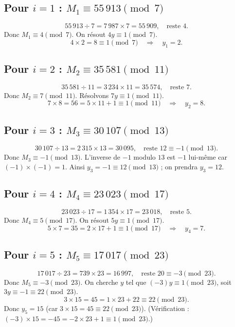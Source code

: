 \documentclass[12pt,a4paper]{article}
\begin{document}
\subsection*{Pour $i=1$ : $M_1 \equiv 55\,913 \pmod{7}$}
\[
55\,913 \div 7 = 7\,987 \times 7 = 55\,909,\quad \text{reste } 4.
\]
Donc $M_1 \equiv 4 \pmod{7}$.
On résout $4y \equiv 1 \pmod{7}$.
\[
4 \times 2 = 8 \equiv 1 \pmod{7} \quad\Longrightarrow\quad y_1 = 2.
\]

\subsection*{Pour $i=2$ : $M_2 \equiv 35\,581 \pmod{11}$}
\[
35\,581 \div 11 = 3\,234 \times 11 = 35\,574,\quad \text{reste } 7.
\]
Donc $M_2 \equiv 7 \pmod{11}$.
Résolvons $7y \equiv 1 \pmod{11}$.
\[
7 \times 8 = 56 = 5\times 11 + 1 \equiv 1 \pmod{11} \quad\Longrightarrow\quad y_2 = 8.
\]

\subsection*{Pour $i=3$ : $M_3 \equiv 30\,107 \pmod{13}$}
\[
30\,107 \div 13 = 2\,315 \times 13 = 30\,095,\quad \text{reste } 12 \equiv -1 \pmod{13}.
\]
Donc $M_3 \equiv -1 \pmod{13}$.
L’inverse de $-1$ modulo $13$ est $-1$ lui-même car $(-1)\times(-1)=1$.
Ainsi $y_3 = -1 \equiv 12 \pmod{13}$ ; on prendra $y_3 = 12$.

\subsection*{Pour $i=4$ : $M_4 \equiv 23\,023 \pmod{17}$}
\[
23\,023 \div 17 = 1\,354 \times 17 = 23\,018,\quad \text{reste } 5.
\]
Donc $M_4 \equiv 5 \pmod{17}$.
On résout $5y \equiv 1 \pmod{17}$.
\[
5 \times 7 = 35 = 2\times 17 + 1 \equiv 1 \pmod{17} \quad\Longrightarrow\quad y_4 = 7.
\]

\subsection*{Pour $i=5$ : $M_5 \equiv 17\,017 \pmod{23}$}
\[
17\,017 \div 23 = 739 \times 23 = 16\,997,\quad \text{reste } 20 \equiv -3 \pmod{23}.
\]
Donc $M_5 \equiv -3 \pmod{23}$.
On cherche $y$ tel que $(-3)y \equiv 1 \pmod{23}$, soit $3y \equiv -1 \equiv 22 \pmod{23}$.
\[
3 \times 15 = 45 = 1\times 23 + 22 \equiv 22 \pmod{23}.
\]
Donc $y_5 = 15$ (car $3\times15=45 \equiv 22 \pmod{23}$).
(Vérification : $(-3)\times15 = -45 = -2\times23 + 1 \equiv 1 \pmod{23}$.)
\end{document}
